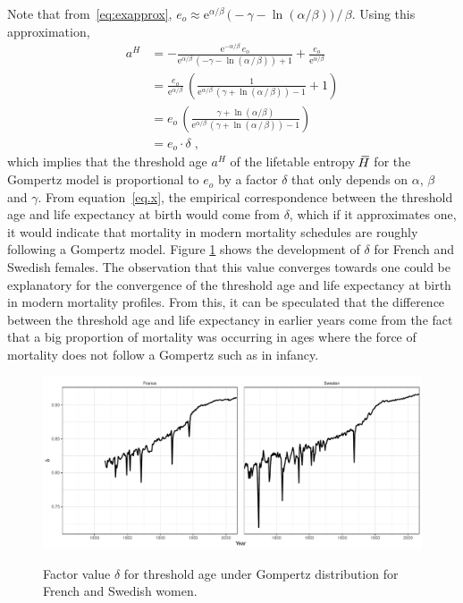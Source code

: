 \documentclass[a4paper,twoside, openright, 12pt, leqno]{article}
\newcommand*\xbar[1]{%
   \hbox{%
     \vbox{%
       \hrule height 0.5pt %
       \kern0.3ex%
       \hbox{%
         \kern-0.28em%
         \ensuremath{#1}%
         \kern-0.05em%
       }%
     }%
   }%
}
\begin{document}
Note that from~\eqref{eq:exapprox}, $e_o\approx \mathrm{e}^{\alpha/\beta}\,\big(-\gamma-\ln(\alpha/\beta)\big)\,/\,\beta$. Using this approximation,
%
\begin{equation}
  \begin{split}
 	a^H & = -\frac{\mathrm{e}^{-\alpha/\beta}\,e_o}{\mathrm{e}^{\alpha/\beta}\,\left(-\gamma-\ln\left(\alpha\,/\,\beta\right)\right)+1}+\frac{e_o}{\mathrm{e}^{\alpha/\beta}}	\\
 	& = \frac{e_o}{\mathrm{e}^{\alpha/\beta}}\,\left(\frac{1}{\mathrm{e}^{\alpha/\beta}\,( \gamma+\ln\left(\alpha\,/\,\beta\right))-1}+1\right)	 \\
 	& = e_o\,\left(\frac{\gamma+\ln(\alpha/\beta)}{\mathrm{e}^{\alpha/\beta}\,( \gamma+\ln\left(\alpha\,/\,\beta\right))-1}\right)			 \\
 	& = e_o \cdot \delta\;,
  \end{split}
  \label{eq.x}
\end{equation}
%
which implies that the threshold age $a^H$ of the lifetable entropy $\,\xbar{H}$ for the Gompertz model is proportional to $e_o$ by a factor $\delta$ that only depends on $\alpha$, $\beta$ and $\gamma$. From equation~\eqref{eq.x}, the empirical correspondence between the threshold age and life expectancy at birth would come from $\delta$, which if it approximates one, it would  indicate that mortality in modern mortality schedules are roughly following a Gompertz model. Figure \ref{Fig:delta} shows the development of $\delta$ for French and Swedish females. The observation that this value converges towards one could be explanatory for the convergence of the threshold age and life expectancy at birth in modern mortality profiles. From this, it can be speculated that the difference between the threshold age and life expectancy in earlier years come from the fact that a big proportion of mortality was occurring in ages where the force of mortality does not follow a Gompertz such as in infancy.
\linebreak


\begin{figure}[h!]
\caption{Factor value $\delta$ for threshold age under Gompertz distribution for French and Swedish women.}
\centering
\includegraphics[scale=.5]{Figure_delta}
\label{Fig:delta}
\end{figure}
\end{document}
